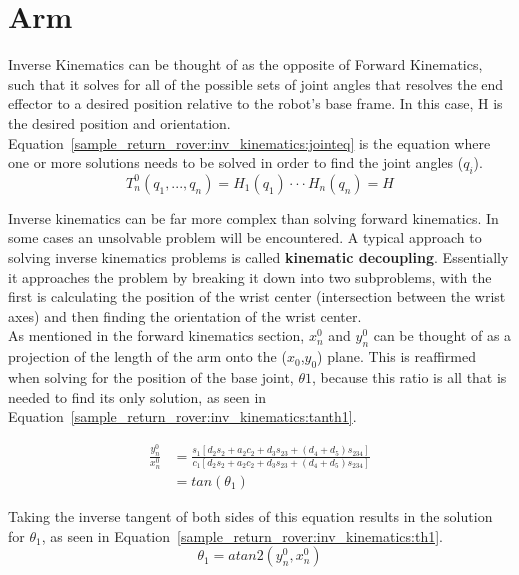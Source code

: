 \section{Arm}
Inverse Kinematics can be thought of as the opposite of Forward Kinematics, such that it solves for all of the possible sets of joint angles that resolves the end effector to a desired position relative to the robot's base frame. In this case, H is the desired position and orientation. Equation~\ref{sample_return_rover:inv_kinematics:jointeq} is the equation where one or more solutions needs to be solved in order to find the joint angles ($q_{i}$).
\begin{equation}
	T^{0}_{n}(q_{1},...,q_{n}) = H_{1}(q_{1})\cdot\cdot\cdot H_{n}(q_{n}) = H
	\label{sample_return_rover:inv_kinematics:jointeq} 
\end{equation}	

Inverse kinematics can be far more complex than solving forward kinematics. In some cases an unsolvable problem will be encountered. A typical approach to solving inverse kinematics problems is called \textbf{kinematic decoupling}. Essentially it approaches the problem by breaking it down into two subproblems, with the first is calculating the position of the wrist center (intersection between the wrist axes) and then finding the orientation of the wrist center. \cite{spong} \\

As mentioned in the forward kinematics section, $x^{0}_{n}$ and $y^{0}_{n}$ can be thought of as a projection of the length of the arm onto the ($x_{0}$,$y_{0}$) plane. This is reaffirmed when solving for the position of the base joint, $\theta{1}$, because this ratio is all that is needed to find its only solution, as seen in Equation~\ref{sample_return_rover:inv_kinematics:tanth1}.

\begin{equation}\label{sample_return_rover:inv_kinematics:tanth1}
	\begin{split}
		\frac{y^{0}_{n}}{x^{0}_{n}} & =
		\frac{s_{1}[d_{2}s_{2}+a_{2}c_{2}+d_{3}s_{23}+(d_{4}+d_{5})s_{234}]}
		{c_{1}[d_{2}s_{2}+a_{2}c_{2}+d_{3}s_{23}+(d_{4}+d_{5})s_{234}]} \\
		& = tan(\theta_{1})
	\end{split}
\end{equation}

Taking the inverse tangent of both sides of this equation results in the solution for $\theta_{1}$, as seen in Equation~\ref{sample_return_rover:inv_kinematics:th1}.
\begin{equation}\label{sample_return_rover:inv_kinematics:th1}
	\theta_{1} = atan2(y^{0}_{n}, x^{0}_{n})
\end{equation}

